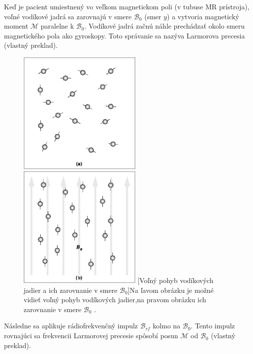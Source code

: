 Keď je pacient umiestnený vo veľkom magnetickom poli (v tubuse MR prístroja), voľné vodíkové jadrá sa zarovnajú v smere $\mathcal{B}_{0}$ (smer $y$) a vytvoria magnetický moment $\mathcal{M}$ paralelne k $\mathcal{B}_{0}$. Vodíkové jadrá začnú náhle prechádzať okolo smeru magnetického pola ako gyroskopy. Toto správanie sa nazýva Larmorova precesia \cite{basic_principles_of_mri} (vlastný preklad).

\begin {figure}[H]
        \centering
        \includegraphics[height=6cm]{media/hydrogen/hydrogen_moving_freely.png}
        \includegraphics[height=6cm]{media/hydrogen/hydrogen_oscilating.png}
        \captionsetup{justification=centering}
        [Voľný pohyb vodíkových jadier a ich zarovnanie v smere $\mathcal{B}_{0}$]{Na ľavom obrázku je možné vidieť voľný pohyb vodíkových jadier,\newline na pravom obrázku ich zarovnanie v smere $\mathcal{B}_{0}$ \cite{basic_principles_of_mri}.}
\end {figure}

Následne sa aplikuje rádiofrekvenčný impulz $\mathcal{B}_{rf}$ kolmo na $\mathcal{B}_{0}$. \newline
Tento impulz rovnajúci sa frekvencii Larmorovej precesie spôsobí posun \newline $\mathcal{M}$ od $\mathcal{B}_{0}$ \cite{basic_principles_of_mri} (vlastný preklad).


